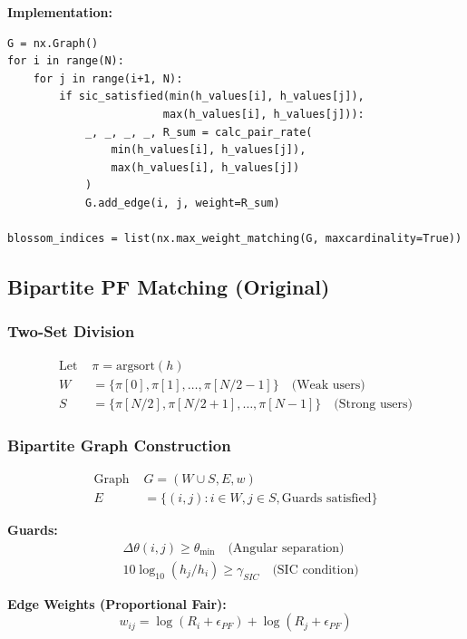 \documentclass[12pt,a4paper]{article}
\begin{document}
\textbf{Implementation:}
\begin{lstlisting}[caption={Blossom Maximum Weight Matching}]
G = nx.Graph()
for i in range(N):
    for j in range(i+1, N):
        if sic_satisfied(min(h_values[i], h_values[j]), 
                        max(h_values[i], h_values[j])):
            _, _, _, _, R_sum = calc_pair_rate(
                min(h_values[i], h_values[j]), 
                max(h_values[i], h_values[j])
            )
            G.add_edge(i, j, weight=R_sum)

blossom_indices = list(nx.max_weight_matching(G, maxcardinality=True))
\end{lstlisting}

\subsection{Bipartite PF Matching (Original)}

\subsubsection{Two-Set Division}

\begin{align}
\text{Let } &\pi = \text{argsort}(h) \\
W &= \{\pi[0], \pi[1], \ldots, \pi[N/2-1]\} \quad \text{(Weak users)} \\
S &= \{\pi[N/2], \pi[N/2+1], \ldots, \pi[N-1]\} \quad \text{(Strong users)}
\end{align}

\subsubsection{Bipartite Graph Construction}

\begin{align}
\text{Graph } &G = (W \cup S, E, w) \\
E &= \{(i,j) : i \in W, j \in S, \text{Guards satisfied}\}
\end{align}

\textbf{Guards:}
\begin{align}
&\Delta\theta(i, j) \geq \theta_{\min} \quad \text{(Angular separation)} \\
&10\log_{10}(h_j/h_i) \geq \gamma_{SIC} \quad \text{(SIC condition)}
\end{align}

\textbf{Edge Weights (Proportional Fair):}
\begin{equation}
w_{ij} = \log(R_i + \epsilon_{PF}) + \log(R_j + \epsilon_{PF})
\end{equation}
\end{document}

